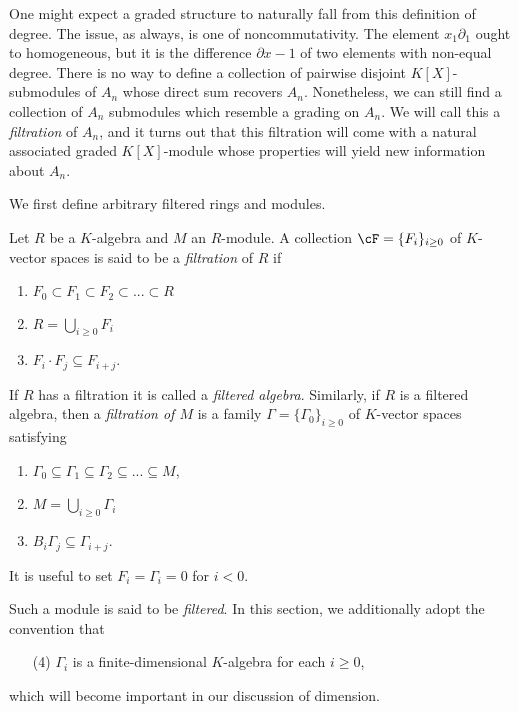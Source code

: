 One might expect a graded structure to naturally fall from this definition of degree. The issue, as always, is one of noncommutativity. The element $x_1\partial_1$ ought to homogeneous, but it is the difference $\partial x - 1$ of two elements with non-equal degree. There is no way to define a collection of pairwise disjoint $K[X]$-submodules of $A_n$ whose direct sum recovers $A_n$. Nonetheless, we can still find a collection of $A_n$ submodules which resemble a grading on $A_n$. We will call this a \emph{filtration} of $A_n$, and it turns out that this filtration will come with a natural associated graded $K[X]$-module whose properties will yield new information about $A_n$.

We first define arbitrary filtered rings and modules.

\begin{defn}\label{defn:filtered-ring}
	Let $R$ be a $K$-algebra and $M$ an $R$-module. A collection $\cF = \{F_i\}_{i \geq 0}$ of $K$-vector spaces is said to be a \emph{filtration} of $R$ if
	\begin{enumerate}[(1)]
		\item $F_0\subset F_1 \subset F_2 \subset ... \subset R$
		\item $R = \bigcup_{i\geq 0} F_i$
		\item $F_i\cdot F_j \subseteq F_{i+j}$.
	\end{enumerate}
	If $R$ has a filtration it is called a \emph{filtered algebra}. Similarly, if $R$ is a filtered algebra, then a \emph{filtration of $M$} is a family $\Gamma = \{\Gamma_0\}_{i\geq 0}$ of $K$-vector spaces satisfying
	\begin{enumerate}[(1)]
		\item $\Gamma_0 \subseteq \Gamma_1 \subseteq \Gamma_2 \subseteq ... \subseteq M$,
		\item $M = \bigcup_{i\geq 0} \Gamma_i$
		\item $B_i\Gamma_j \subseteq \Gamma_{i+j}$.
	\end{enumerate}
	It is useful to set $F_i = \Gamma_i = 0$ for $i < 0$.
\end{defn}
Such a module is said to be \emph{filtered}. In this section, we additionally adopt the convention that
\begin{enumerate}
	\item[(4)] $\Gamma_i$ is a finite-dimensional $K$-algebra for each $i \geq 0$,
\end{enumerate}
which will become important in our discussion of dimension.

